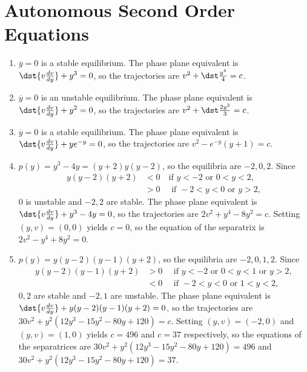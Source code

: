 \documentclass[openany]{book}
\newenvironment{sectionSolutions}{
 \begin{enumerate}[item-label={\thesection.\arabic{enumi}.}]
}{
 \end{enumerate}
}
\begin{document}
\section{Autonomous Second Order Equations}

\begin{sectionSolutions}

\addtocounter{enumi}{-1}
\item%
$\overline y=0$ is a stable equilibrium.
The phase plane equivalent is $\dst{v\frac{dv}{ dy}}+y^3=0$, so the
 trajectories are $v^2+\dst\frac{y^4}{4}=c$.




\addtocounter{enumi}{-1}
\item%
$\overline y=0$ is an unstable equilibrium.
The phase plane equivalent is $\dst{v\frac{dv}{ dy}}+y^2=0$, so the
 trajectories are $v^2+\dst\frac{2y^3}{3}=c$.



\item
$\overline y=0$ is a stable equilibrium.
The phase plane equivalent is $\dst{v\frac{dv}{ dy}}+ye^{-y}=0$, so the
 trajectories are $v^2-e^{-y}(y+1)=c$.




\item
$p(y)=y^3-4y=(y+2)y(y-2)$, so the
 equilibria are $-2,0,2$.
Since
\begin{align*}
y(y-2)(y+2)&<0\quad \text{if } y<-2\text{ or }0<y<2,\\
&>0\quad\text{ if }-2<y<0\text{ or }y>2,
\end{align*}
$0$ is unstable and $-2,2$ are stable. The phase plane equivalent is
$\dst{v\frac{dv}{ dy}}+y^3-4y=0$, so the trajectories are
$2v^2+y^4-8y^2=c$. Setting $(y,v)=(0,0)$ yields $c=0$, so the equation
of the separatrix is $2v^2-y^4+8y^2=0$.


\item
$p(y)=y(y-2)(y-1)(y+2)$, so the
 equilibria are $-2,0,1,2$.
Since
\begin{align*}
y(y-2)(y-1)(y+2)&>0\quad \text{ if } y<-2\text{ or }0<y<1\text{ or }y>2,\\
&<0\quad\text{ if }-2<y<0\text{ or }1<y<2,
\end{align*}
$0,2$ are stable and $-2,1$ are unstable. The phase plane
equivalent is
$\dst{v\frac{dv}{ dy}}+y(y-2)(y-1)(y+2)=0$, so the trajectories are
$30v^2+y^2(12y^3-15y^2-80y+120)=c$. Setting $(y,v)=(-2,0)$
and $(y,v)=(1,0)$
yields
$c=496$ and $c=37$ respectively, so the equations of the separatrices
are $30v^2+y^2(12y^3-15y^2-80y+120)=496$
and $30v^2+y^2(12y^3-15y^2-80y+120)=37$.



\end{sectionSolutions}
\end{document}
